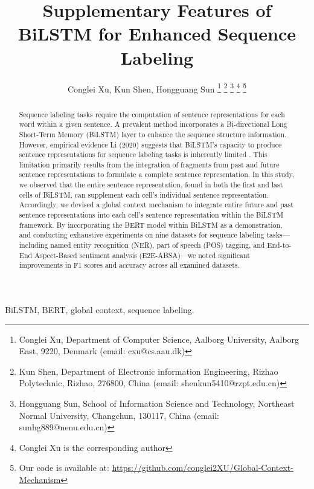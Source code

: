 \documentclass[lettersize,journal]{IEEEtran}
\begin{document}
\title{Supplementary Features of BiLSTM for Enhanced Sequence Labeling}
\author{Conglei Xu, Kun Shen, Hongguang Sun
\thanks{ Conglei Xu, Department of Computer Science, Aalborg University, Aalborg East, 9220, Denmark (email: cxu@cs.aau.dk)} \thanks{Kun Shen,  Department of Electronic information Engineering, Rizhao Polytechnic, Rizhao, 276800, China (email: shenkun5410@rzpt.edu.cn)}
\thanks{Hongguang Sun,  School of Information Science and Technology, Northeast Normal University, Changchun, 130117, China (email: sunhg889@nenu.edu.cn)
}
\thanks{Conglei Xu is the corresponding author}
\thanks{Our code is available at: \url{https://github.com/conglei2XU/Global-Context-Mechanism}}
}





\maketitle

\begin{abstract}
Sequence labeling tasks require the computation of sentence representations for each word within a given sentence. A prevalent method incorporates a Bi-directional Long Short-Term Memory (BiLSTM) layer to enhance the sequence structure information. However, empirical evidence Li (2020) suggests that BiLSTM’s capacity to produce sentence representations for sequence labeling tasks is inherently limited \cite{Li2020}. This limitation primarily results from the integration of fragments from past and future sentence representations to formulate a complete sentence representation. In this study, we observed that the entire sentence representation, found in both the first and last cells of BiLSTM, can supplement each cell’s individual sentence representation. Accordingly, we devised a global context mechanism to integrate entire future and past sentence representations into each cell's sentence representation within the BiLSTM framework. By incorporating the BERT model within BiLSTM as a demonstration, and conducting exhaustive experiments on nine datasets for sequence labeling tasks—including named entity recognition (NER), part of speech (POS) tagging, and End-to-End Aspect-Based sentiment analysis (E2E-ABSA)—we noted significant improvements in F1 scores and accuracy across all examined datasets.
\end{abstract}

\begin{IEEEkeywords}
BiLSTM, BERT, global context, sequence labeling.
\end{IEEEkeywords}
\end{document}
